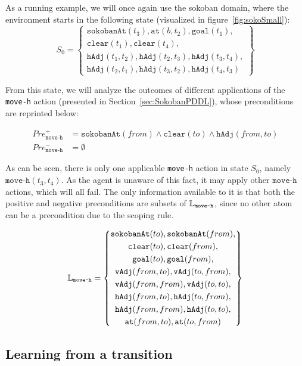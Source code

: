 \documentclass[../Master.tex]{subfiles}
\begin{document}
\begin{example}\label{ex:ncp:sokobanSetup}
    As a running example, we will once again use the sokoban domain, where the environment starts in the following state (visualized in figure~\ref{fig:sokoSmall}):
    \begin{equation*}
        S_0 =
        \left\{
            \begin{gathered}
                \texttt{sokobanAt}(t_3), \texttt{at}(b, t_2), \texttt{goal}(t_1), \\
                \texttt{clear}(t_1), \texttt{clear}(t_4), \\
                \texttt{hAdj}(t_1, t_2), \texttt{hAdj}(t_2, t_3),
                \texttt{hAdj}(t_3, t_4), \\
                \texttt{hAdj}(t_2, t_1), \texttt{hAdj}(t_3, t_2),
                \texttt{hAdj}(t_4, t_3)
            \end{gathered}
        \right\}
    \end{equation*}

    From this state, we will analyze the outcomes of different applications of the \texttt{move-h} action (presented in Section~\ref{sec:SokobanPDDL}), whose preconditions are reprinted below:

    \begin{align*}
        Pre_{\texttt{move-h}}^+ &= 
            \texttt{sokobanAt}(from) \land \texttt{clear}(to) \land \texttt{hAdj}(from, to)
             \\
        Pre_{\texttt{move-h}}^- &= \emptyset
    \end{align*}

    As can be seen, there is only one applicable \texttt{move-h} action in state $S_0$, namely $\texttt{move-h}(t_3,t_4)$. As the agent is unaware of this fact, it may apply other $\texttt{move-h}$ actions, which will all fail. The only information available to it is that both the positive and negative preconditions are subsets of $\mathbb{L}_{\texttt{move-h}}$, since no other atom can be a precondition due to the scoping rule.

    \begin{equation*}
    \mathbb{L}_{\texttt{move-h}} =
    \left\{
        \begin{gathered}
            \texttt{sokobanAt}(to), \texttt{sokobanAt}(from), \\
            \texttt{clear}(to), \texttt{clear}(from), \\
            \texttt{goal}(to), \texttt{goal}(from), \\
            \texttt{vAdj}(from, to), \texttt{vAdj}(to, from), \\
            \texttt{vAdj}(from, from), \texttt{vAdj}(to, to), \\
            \texttt{hAdj}(from, to), \texttt{hAdj}(to, from), \\
            \texttt{hAdj}(from, from), \texttt{hAdj}(to, to), \\
            \texttt{at}(from, to), \texttt{at}(to, from)
        \end{gathered}
    \right\}
    \end{equation*}
\end{example}

\subsection{Learning from a transition}

\end{document}
